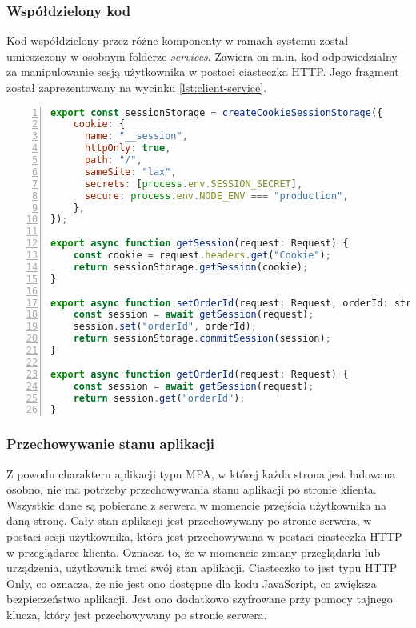 \subsubsection{Współdzielony kod} 

Kod współdzielony przez różne komponenty w ramach systemu został umieszczony w osobnym folderze \textit{services}. Zawiera on m.in. kod odpowiedzialny za manipulowanie sesją użytkownika w postaci ciasteczka HTTP. Jego fragment został zaprezentowany na wycinku \ref{lst:client-service}.

\begin{lstlisting}[caption={Kod funkcji manipulujących sesją użytkownika},label={lst:client-service},captionpos=b,language=JavaScript,numbers=left,showstringspaces=false]
export const sessionStorage = createCookieSessionStorage({
    cookie: {
      name: "__session",
      httpOnly: true,
      path: "/",
      sameSite: "lax",
      secrets: [process.env.SESSION_SECRET],
      secure: process.env.NODE_ENV === "production",
    },
});

export async function getSession(request: Request) {
    const cookie = request.headers.get("Cookie");
    return sessionStorage.getSession(cookie);
}

export async function setOrderId(request: Request, orderId: string) {
    const session = await getSession(request);
    session.set("orderId", orderId);
    return sessionStorage.commitSession(session);
}

export async function getOrderId(request: Request) {
    const session = await getSession(request);
    return session.get("orderId");
}
\end{lstlisting}

\subsubsection{Przechowywanie stanu aplikacji}

Z powodu charakteru aplikacji typu MPA, w której każda strona jest ładowana osobno, nie ma potrzeby przechowywania stanu aplikacji po stronie klienta. Wszystkie dane są pobierane z serwera w momencie przejścia użytkownika na daną stronę. Cały stan aplikacji jest przechowywany po stronie serwera, w postaci sesji użytkownika, która jest przechowywana w postaci ciasteczka HTTP w przeglądarce klienta. Oznacza to, że w momencie zmiany przeglądarki lub urządzenia, użytkownik traci swój stan aplikacji. Ciasteczko to jest typu HTTP Only, co oznacza, że nie jest ono dostępne dla kodu JavaScript, co zwiększa bezpieczeństwo aplikacji. Jest ono dodatkowo szyfrowane przy pomocy tajnego klucza, który jest przechowywany po stronie serwera.